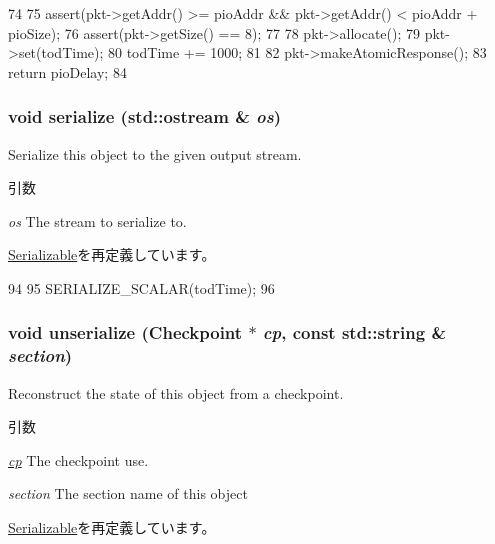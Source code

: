 \begin{DoxyCode}
74 {
75     assert(pkt->getAddr() >= pioAddr && pkt->getAddr() < pioAddr + pioSize);
76     assert(pkt->getSize() == 8);
77 
78     pkt->allocate();
79     pkt->set(todTime);
80     todTime += 1000;
81 
82     pkt->makeAtomicResponse();
83     return pioDelay;
84 }
\end{DoxyCode}
\hypertarget{classDumbTOD_a53e036786d17361be4c7320d39c99b84}{
\subsubsection[{serialize}]{\setlength{\rightskip}{0pt plus 5cm}void serialize (std::ostream \& {\em os})}}
\label{classDumbTOD_a53e036786d17361be4c7320d39c99b84}
Serialize this object to the given output stream. 
\begin{DoxyParams}{引数}
\item[{\em os}]The stream to serialize to. \end{DoxyParams}


\hyperlink{classSerializable_ad6272f80ae37e8331e3969b3f072a801}{Serializable}を再定義しています。


\begin{DoxyCode}
94 {
95     SERIALIZE_SCALAR(todTime);
96 }
\end{DoxyCode}
\hypertarget{classDumbTOD_af22e5d6d660b97db37003ac61ac4ee49}{
\subsubsection[{unserialize}]{\setlength{\rightskip}{0pt plus 5cm}void unserialize ({\bf Checkpoint} $\ast$ {\em cp}, \/  const std::string \& {\em section})}}
\label{classDumbTOD_af22e5d6d660b97db37003ac61ac4ee49}
Reconstruct the state of this object from a checkpoint. 
\begin{DoxyParams}{引数}
\item[{\em \hyperlink{namespacecp}{cp}}]The checkpoint use. \item[{\em section}]The section name of this object \end{DoxyParams}


\hyperlink{classSerializable_af100c4e9feabf3cd918619c88c718387}{Serializable}を再定義しています。


